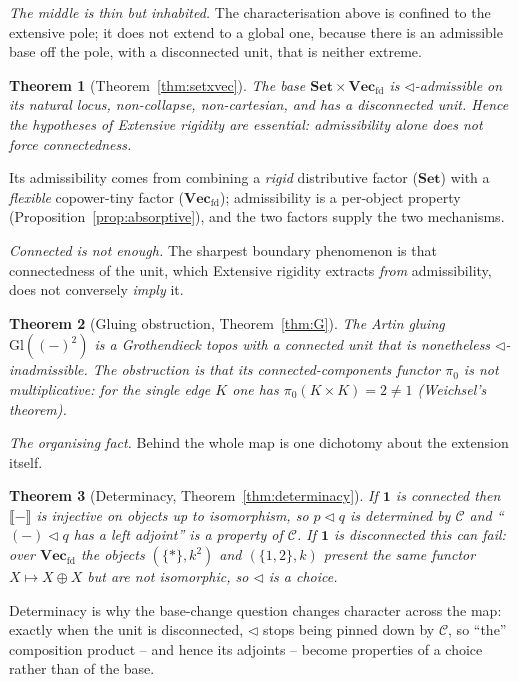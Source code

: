 \documentclass[11pt]{amsart}
\theoremstyle{plain}
\newtheorem{theorem}{Theorem}[section]
\theoremstyle{definition}
\newcommand{\C}{\mathcal{C}}
\newcommand{\ext}[1]{\llbracket #1 \rrbracket}
\newcommand{\Setb}{\mathbf{Set}}
\newcommand{\Vecfd}{\mathbf{Vec}_{\mathrm{fd}}}
\newcommand{\Gl}{\mathrm{Gl}}
\newcommand{\comp}{\mathbin{\triangleleft}}
\newcommand{\one}{\mathbf{1}}
\newcommand{\pizero}{\pi_0}
\begin{document}
\emph{The middle is thin but inhabited.} The characterisation above is confined to the extensive
pole; it does not extend to a global one, because there is an admissible base off the pole, with a
disconnected unit, that is neither extreme.

\begin{theorem}[Theorem~\ref{thm:setxvec}]\label{intro:setxvec}
The base $\Setb\times\Vecfd$ is $\comp$-admissible on its natural locus, non-collapse, non-cartesian,
and has a disconnected unit. Hence the hypotheses of Extensive rigidity are essential:
admissibility alone does not force connectedness.
\end{theorem}

Its admissibility comes from combining a \emph{rigid} distributive factor ($\Setb$) with a
\emph{flexible} copower-tiny factor ($\Vecfd$); admissibility is a per-object property
(Proposition~\ref{prop:absorptive}), and the two factors supply the two mechanisms.

\emph{Connected is not enough.} The sharpest boundary phenomenon is that connectedness of the unit,
which Extensive rigidity extracts \emph{from} admissibility, does not conversely \emph{imply} it.

\begin{theorem}[Gluing obstruction, Theorem~\ref{thm:G}]\label{intro:G}
The Artin gluing $\Gl((-)^2)$ is a Grothendieck topos with a connected unit that is nonetheless
$\comp$-inadmissible. The obstruction is that its connected-components functor $\pizero$ is not
multiplicative: for the single edge $K$ one has $\pizero(K\times K)=2\neq 1$ (Weichsel's theorem).
\end{theorem}

\emph{The organising fact.} Behind the whole map is one dichotomy about the extension itself.

\begin{theorem}[Determinacy, Theorem~\ref{thm:determinacy}]\label{intro:determinacy}
If $\one$ is connected then $\ext{-}$ is injective on objects up to isomorphism, so $p\comp q$ is
\emph{determined} by $\C$ and ``$({-})\comp q$ has a left adjoint'' is a property of $\C$. If $\one$
is disconnected this can fail: over $\Vecfd$ the objects $(\{*\},k^2)$ and $(\{1,2\},k)$ present the
same functor $X\mapsto X\oplus X$ but are not isomorphic, so $\comp$ is a \emph{choice}.
\end{theorem}

Determinacy is why the base-change question changes character across the map: exactly when the unit
is disconnected, $\comp$ stops being pinned down by $\C$, so ``the'' composition product -- and hence
its adjoints -- become properties of a choice rather than of the base.
\end{document}
